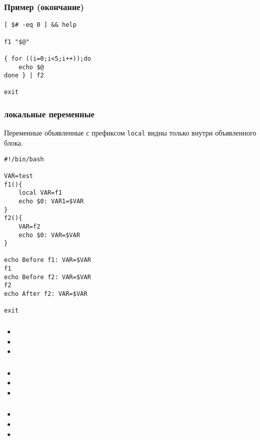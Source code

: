 \begin{frame}[fragile]
	\frametitle{Пример (окончание)}
	\small
	\begin{lstlisting}
[ $# -eq 0 ] && help

f1 "$@"

{ for ((i=0;i<5;i++));do
	echo $@
done } | f2

exit
	\end{lstlisting}

\end{frame}

\begin{frame}[fragile]
	\frametitle{локальные переменные}

	Переменные объявленные с префиксом {\tt local} видны только внутри объявленного блока.

	\small
	\begin{lstlisting}
#!/bin/bash

VAR=test
f1(){
	local VAR=f1
	echo $0: VAR1=$VAR
}
f2(){
    VAR=f2
    echo $0: VAR=$VAR
}

echo Before f1: VAR=$VAR
f1
echo Before f2: VAR=$VAR
f2
echo After f2: VAR=$VAR

exit
		\end{lstlisting}
\end{frame}

\begin{frame}
	\frametitle{}
	\begin{itemize}
		\item 
		\item 
		\item
  \end{itemize}
\end{frame}

\begin{frame}
	\frametitle{}
	\begin{itemize}
		\item 
		\item 
		\item
  \end{itemize}
\end{frame}

\begin{frame}
	\frametitle{}
	\begin{itemize}
		\item 
		\item 
		\item
  \end{itemize}
\end{frame}



